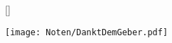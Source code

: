 []

\markboth{\songtitle}{\songtitle}

\beginverse
\endverse

\centering\texttt{[image: Noten/DanktDemGeber.pdf]}

\endsong

\beginscripture

\endscripture

\begin{intersong}

\end{intersong}